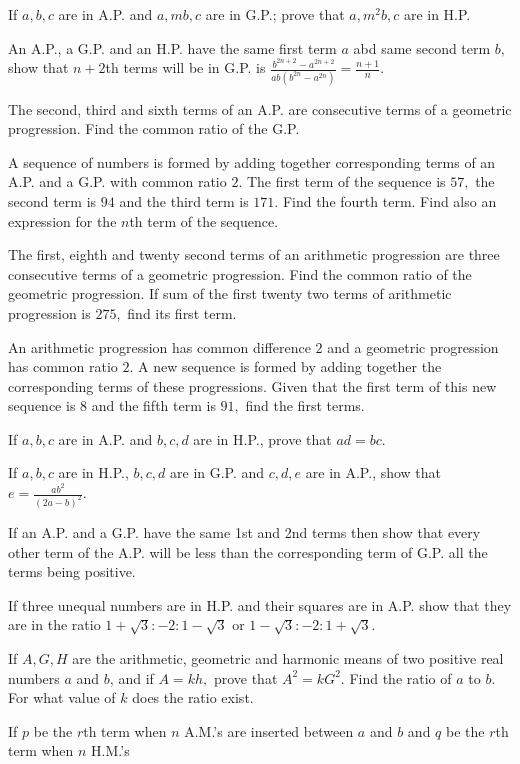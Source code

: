 \item If $a, b, c$ are in A.P. and $a, mb, c$ are in G.P.; prove that $a, m^2b, c$ are in H.P.
\item An A.P., a G.P. and an H.P. have the same first term $a$ abd same second term $b,$ show that $n + 2$th terms will
  be in G.P. is $\frac{b^{2n + 2} - a^{2n + 2}}{ab(b^{2n} - a^{2n})} = \frac{n + 1}{n}$.
\item The second, third and sixth terms of an A.P. are consecutive terms of a geometric progression. Find the common
  ratio of the G.P.
\item A sequence of numbers is formed by adding together corresponding terms of an A.P. and a G.P. with common ratio $2.$
  The first term of the sequence is $57,$ the second term is $94$ and the third term is $171.$ Find the fourth term. Find also an
  expression for the $n$th term of the sequence.
\item The first, eighth and twenty second terms of an arithmetic progression are three consecutive terms of a geometric
  progression. Find the common ratio of the geometric progression. If sum of the first twenty two terms of arithmetic progression
  is $275,$ find its first term.
\item An arithmetic progression has common difference $2$ and a geometric progression has common ratio $2.$ A new
  sequence is formed by adding together the corresponding terms of these progressions. Given that the first term of this new
  sequence is $8$ and the fifth term is $91,$ find the first terms.
\item If $a, b, c$ are in A.P. and $b, c, d$ are in H.P., prove that $ad = bc$.
\item If $a, b, c$ are in H.P., $b, c, d$ are in G.P. and $c, d, e$ are in A.P., show that $e = \frac{ab^2}{(2a - b)^2}$.
\item If an A.P. and a G.P. have the same 1st and 2nd terms then show that every other term of the A.P. will be less than
  the corresponding term of G.P. all the terms being positive.
\item If three unequal numbers are in H.P. and their squares are in A.P. show that they are in the ratio $1 +
  \sqrt{3}:-2:1 - \sqrt{3}$ or $1 - \sqrt{3}:-2:1 + \sqrt{3}$.
\item If $A, G, H$ are the arithmetic, geometric and harmonic means of two positive real numbers $a$ and $b$, and if $A =
  kh,$ prove that $A^2 = kG^2.$ Find the ratio of $a$ to $b.$ For what value of $k$ does the ratio exist.
\item If $p$ be the $r$th term when $n$ A.M.'s are inserted between $a$ and $b$ and $q$ be the $r$th term when $n$ H.M.'s
